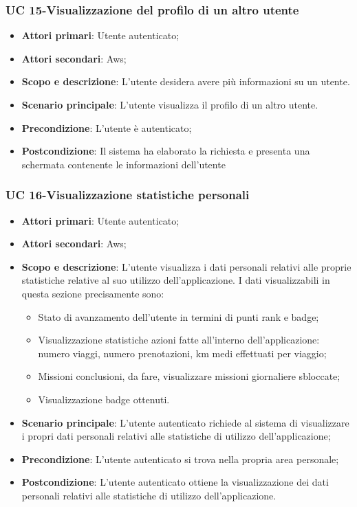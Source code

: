  
        \subsubsection{UC 15-Visualizzazione del profilo di un altro utente}
        \begin{itemize}
            \item  \textbf{Attori primari}: Utente autenticato;
            \item \textbf{Attori secondari}: Aws;
            \item \textbf{Scopo e descrizione}: L'utente desidera avere più informazioni su un utente.
            \item \textbf{Scenario principale}: L'utente visualizza il profilo di un altro utente.
            \item \textbf{Precondizione}: L'utente è autenticato;
            \item \textbf{Postcondizione}: Il sistema ha elaborato la richiesta e presenta una schermata contenente le informazioni dell'utente
        \end{itemize}   
  
        
        
    \subsubsection{UC 16-Visualizzazione statistiche personali}  
      \begin{itemize}
        \item \textbf{Attori primari}: Utente autenticato;
        \item \textbf{Attori secondari}: Aws;
        \item \textbf{Scopo e descrizione}: L'utente visualizza i dati personali relativi alle proprie statistiche relative al suo utilizzo dell'applicazione. I dati visualizzabili in questa sezione precisamente sono:
            \begin{itemize}
                \item Stato di avanzamento dell'utente in termini di punti rank e badge;
                \item Visualizzazione statistiche azioni fatte all'interno dell'applicazione: numero viaggi, numero prenotazioni, km medi effettuati per viaggio;
                \item Missioni conclusioni, da fare, visualizzare missioni giornaliere sbloccate;
                \item Visualizzazione badge ottenuti.
            \end{itemize}
        \item \textbf{Scenario principale}: L'utente autenticato richiede al sistema di visualizzare i propri dati personali relativi alle statistiche di utilizzo dell'applicazione;
        \item \textbf{Precondizione}: L'utente autenticato si trova nella propria area personale;
        \item \textbf{Postcondizione}: L'utente autenticato ottiene la visualizzazione dei dati personali relativi alle statistiche di utilizzo dell'applicazione.
        \end{itemize}  
  
